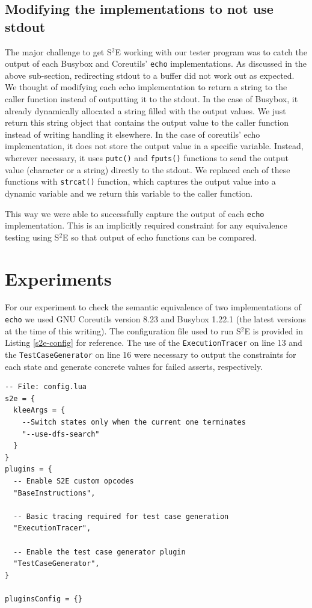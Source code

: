 \documentclass[conference]{IEEEtran}
\begin{document}
\subsection{Modifying the implementations to not use stdout}

The major challenge to get S$^2$E working with our tester program was to catch the output of each Busybox and Coreutils' {\tt echo} implementations. As discussed in the above sub-section, redirecting stdout to a buffer did not work out as expected. We thought of modifying each echo implementation to return a string to the caller function instead of outputting it to the stdout. In the case of Busybox, it already dynamically allocated a string filled with the output values. We just return this string object that contains the output value to the caller function instead of writing handling it elsewhere. In the case of coreutils' echo implementation, it does not store the output value in a specific variable. Instead, wherever necessary, it uses {\tt putc()} and {\tt fputs()} functions to send the output value (character or a string) directly to the stdout. We replaced each of these functions with {\tt strcat()} function, which captures the output value into a dynamic variable and we return this variable to the caller function. 

This way we were able to successfully capture the output of each {\tt echo} implementation. This is an implicitly required constraint for any equivalence testing using S$^2$E so that output of echo functions can be compared.  


\section{Experiments}

For our experiment to check the semantic equivalence of two implementations of {\tt echo} we used GNU Coreutils version 8.23 and Busybox 1.22.1 (the latest versions at the time of this writing). The configuration file used to run S$^2$E is provided in Listing \ref{s2e-config} for reference. The use of the {\tt ExecutionTracer} on line 13 and the {\tt TestCaseGenerator} on line 16 were necessary to output the constraints for each state and generate concrete values for failed asserts, respectively. \\

\begin{lstlisting}[style=Lua, label=s2e-config, abovecaptionskip=2ex, captionpos=b, caption={S$^2$E configuration file used for experiment}]
-- File: config.lua
s2e = {
  kleeArgs = {
    --Switch states only when the current one terminates
    "--use-dfs-search"
  }
}
plugins = {
  -- Enable S2E custom opcodes
  "BaseInstructions",

  -- Basic tracing required for test case generation
  "ExecutionTracer",

  -- Enable the test case generator plugin
  "TestCaseGenerator",
}

pluginsConfig = {}
\end{lstlisting}
\end{document}
